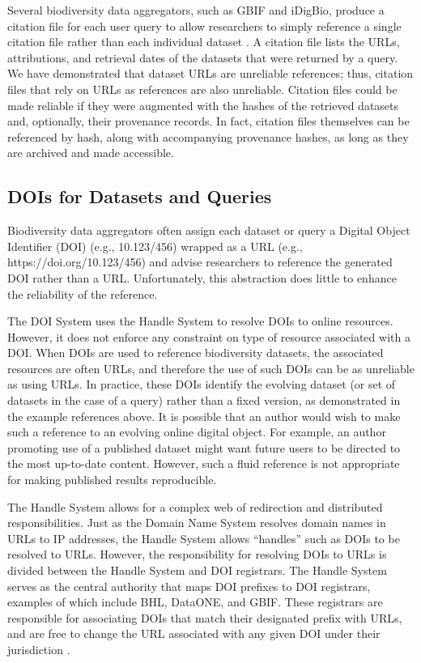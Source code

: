 

Several biodiversity data aggregators, such as GBIF and iDigBio, produce a citation file for each user query to allow researchers to simply reference a single citation file rather than each individual dataset . A citation file lists the URLs, attributions, and retrieval dates of the datasets that were returned by a query. We have demonstrated that dataset URLs are unreliable references; thus, citation files that rely on URLs as references are also unreliable. Citation files could be made reliable if they were augmented with the hashes of the retrieved datasets and, optionally, their provenance records. In fact, citation files themselves can be referenced by hash, along with accompanying provenance hashes, as long as they are archived and made accessible.

\subsection*{DOIs for Datasets and Queries}
Biodiversity data aggregators often assign each dataset or query a Digital Object Identifier (DOI) \citep{Paskin_2009} (e.g., 10.123/456) wrapped as a URL (e.g., https://doi.org/10.123/456) and advise researchers to reference the generated DOI rather than a URL. Unfortunately, this abstraction does little to enhance the reliability of the reference.

The DOI System \citep{Paskin_2009} uses the Handle System \citep{rfc3650} to resolve DOIs to online resources. However, it does not enforce any constraint on type of resource associated with a DOI. When DOIs are used to reference biodiversity datasets, the associated resources are often URLs, and therefore the use of such DOIs can be as unreliable as using URLs. In practice, these DOIs identify the evolving dataset (or set of datasets in the case of a query) rather than a fixed version, as demonstrated in the example references above. It is possible that an author would wish to make such a reference to an evolving online digital object. For example, an author promoting use of a published dataset might want future users to be directed to the most up-to-date content. However, such a fluid reference is not appropriate for making published results reproducible.

The Handle System allows for a complex web of redirection and distributed responsibilities. Just as the Domain Name System resolves domain names in URLs to IP addresses, the Handle System allows ``handles'' such as DOIs to be resolved to URLs. However, the responsibility for resolving DOIs to URLs is divided between the Handle System and DOI registrars. The Handle System serves as the central authority that maps DOI prefixes to DOI registrars, examples of which include BHL, DataONE, and GBIF. These registrars are responsible for associating DOIs that match their designated prefix with URLs, and are free to change the URL associated with any given DOI under their jurisdiction .

